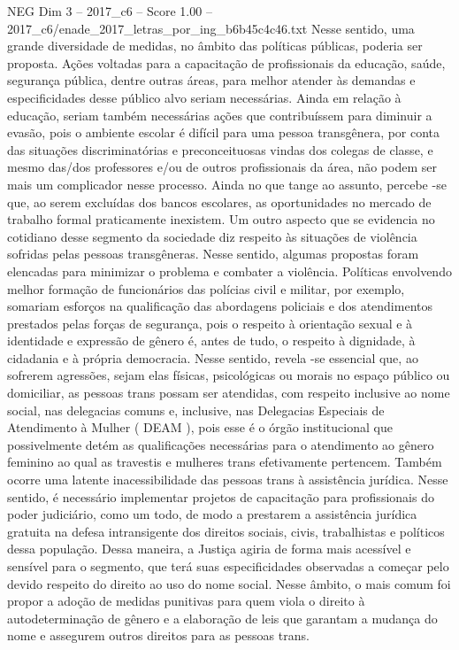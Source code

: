 \begin{textsample}{NEG Dim 3 – 2017\_c6 – Score 1.00 – 2017\_c6/enade\_2017\_letras\_por\_ing\_b6b45c4c46.txt}
Nesse sentido, uma grande diversidade de medidas, no âmbito das políticas públicas, poderia ser proposta.
Ações voltadas para a capacitação de profissionais da educação, saúde, segurança pública, dentre outras áreas, para melhor atender às demandas e especificidades desse público alvo seriam necessárias.
Ainda em relação à educação, seriam também necessárias ações que contribuíssem para diminuir a evasão, pois o ambiente escolar é difícil para uma pessoa transgênera, por conta das situações discriminatórias e preconceituosas vindas dos colegas de classe, e mesmo das/dos professores e/ou de outros profissionais da área, não podem ser mais um complicador nesse processo.
Ainda no que tange ao assunto, percebe -se que, ao serem excluídas dos bancos escolares, as oportunidades no mercado de trabalho formal praticamente inexistem.
Um outro aspecto que se evidencia no cotidiano desse segmento da sociedade diz respeito às situações de violência sofridas pelas pessoas transgêneras.
Nesse sentido, algumas propostas foram elencadas para minimizar o problema e combater a violência.
Políticas envolvendo melhor formação de funcionários das polícias civil e militar, por exemplo, somariam esforços na qualificação das abordagens policiais e dos atendimentos prestados pelas forças de segurança, pois o respeito à orientação sexual e à identidade e expressão de gênero é, antes de tudo, o respeito à dignidade, à cidadania e à própria democracia.
Nesse sentido, revela -se essencial que, ao sofrerem agressões, sejam elas físicas, psicológicas ou morais no espaço público ou domiciliar, as pessoas trans possam ser atendidas, com respeito inclusive ao nome social, nas delegacias comuns e, inclusive, nas Delegacias Especiais de Atendimento à Mulher ( DEAM ), pois esse é o órgão institucional que possivelmente detém as qualificações necessárias para o atendimento ao gênero feminino ao qual as travestis e mulheres trans efetivamente pertencem.
Também ocorre uma latente inacessibilidade das pessoas trans à assistência jurídica.
Nesse sentido, é necessário implementar projetos de capacitação para profissionais do poder judiciário, como um todo, de modo a prestarem a assistência jurídica gratuita na defesa intransigente dos direitos sociais, civis, trabalhistas e políticos dessa população.
Dessa maneira, a Justiça agiria de forma mais acessível e sensível para o segmento, que terá suas especificidades observadas a começar pelo devido respeito do direito ao uso do nome social.
Nesse âmbito, o mais comum foi propor a adoção de medidas punitivas para quem viola o direito à autodeterminação de gênero e a elaboração de leis que garantam a mudança do nome e assegurem outros direitos para as pessoas trans.

\end{textsample}
